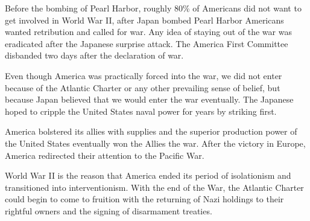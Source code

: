 Before the bombing of Pearl Harbor, roughly 80\% of Americans did not want to get involved in World War II, after Japan bombed Pearl Harbor Americans wanted retribution and called for war.
Any idea of staying out of the war was eradicated after the Japanese surprise attack.
The America First Committee disbanded two days after the declaration of war.

Even though America was practically forced into the war, we did not enter because of the Atlantic Charter or any other prevailing sense of belief, but because Japan believed that we would enter the war eventually.
The Japanese hoped to cripple the United States naval power for years by striking first.

America bolstered its allies with supplies and the superior production power of the United States eventually won the Allies the war.
After the victory in Europe, America redirected their attention to the Pacific War.

World War II is the reason that America ended its period of isolationism and transitioned into interventionism.
With the end of the War, the Atlantic Charter could begin to come to fruition with the returning of Nazi holdings to their rightful owners and the signing of disarmament treaties. 